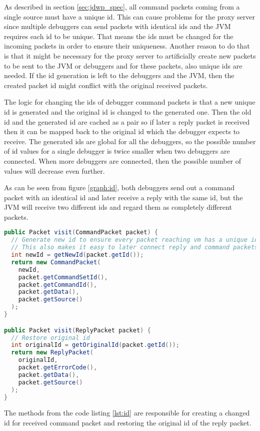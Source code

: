 \documentclass[..thesis.tex]{subfiles}
\begin{document}
As described in section \ref{sec:jdwp_spec}, all command packets coming from a single source must have a unique id.
This can cause problems for the proxy server since multiple debuggers can send packets with identical ids and the JVM requires each id to be unique.
That means the ids must be changed for the incoming packets in order to ensure their uniqueness.
Another reason to do that is that it might be necessary for the proxy server to artificially create new packets to be sent to the JVM or debuggers and for these packets, also unique ids are needed.
If the id generation is left to the debuggers and the JVM, then the created packet id might conflict with the original received packets.

The logic for changing the ids of debugger command packets is that a new unique id is generated and the original id is changed to the generated one.
Then the old id and the generated id are cached as a pair so if later a reply packet is received then it can be mapped back to the original id which the debugger expects to receive.
The generated ids are global for all the debuggers, so the possible number of id values for a single debugger is twice smaller when two debuggers are connected.
When more debuggers are connected, then the possible number of values will decrease even further.



As can be seen from figure \ref{graph:id}, both debuggers send out a command packet with an identical id and later receive a reply with the same id, but the JVM will receive two different ids and regard them as completely different packets.

\begin{lstlisting}[language=java, caption={\textit{Visitor methods for processing the ids of received and written debugger packets.}}, captionpos=b, label={lst:id}]
public Packet visit(CommandPacket packet) {
  // Generate new id to ensure every packet reaching vm has a unique id
  // This also makes it easy to later connect reply and command packets and avoid collision
  int newId = getNewId(packet.getId());
  return new CommandPacket(
    newId,
    packet.getCommandSetId(), 
    packet.getCommandId(), 
    packet.getData(), 
    packet.getSource()
  );
}

public Packet visit(ReplyPacket packet) {
  // Restore original id
  int originalId = getOriginalId(packet.getId());
  return new ReplyPacket(
    originalId,
    packet.getErrorCode(), 
    packet.getData(), 
    packet.getSource()
  );
}
\end{lstlisting}

The  methods from the code listing \ref{lst:id} are responsible for creating a changed id for received command packet and restoring the original id of the reply packet.
\end{document}
